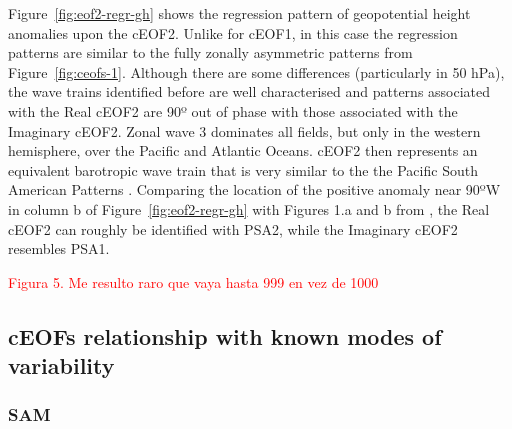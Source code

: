 \documentclass[smallextended]{svjour3}       %
\begin{document}
Figure~\ref{fig:eof2-regr-gh} shows the regression pattern of geopotential height anomalies upon the cEOF2. Unlike for cEOF1, in this case the regression patterns are similar to the fully zonally asymmetric patterns from Figure~\ref{fig:ceofs-1}. Although there are some differences (particularly in 50 hPa), the wave trains identified before are well characterised and patterns associated with the Real cEOF2 are 90º out of phase with those associated with the Imaginary cEOF2. Zonal wave 3 dominates all fields, but only in the western hemisphere, over the Pacific and Atlantic Oceans. cEOF2 then represents an equivalent barotropic wave train that is very similar to the the Pacific South American Patterns \citep{mo2001}.
Comparing the location of the positive anomaly near 90ºW in column b of Figure~\ref{fig:eof2-regr-gh} with Figures 1.a and b from \citet{mo2001}, the Real cEOF2 can roughly be identified with PSA2, while the Imaginary cEOF2 resembles PSA1.

\textcolor{red}{Figura 5. Me resulto raro que vaya hasta 999 en vez de 1000 }

\hypertarget{other-variables}{%
\subsection{cEOFs relationship with known modes of variability}\label{other-variables}}

\hypertarget{sam}{%
\subsubsection{SAM}\label{sam}}
\end{document}
